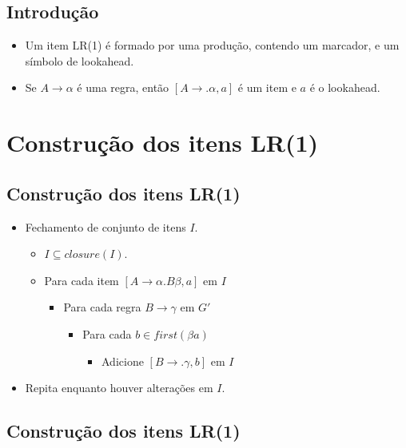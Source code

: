 \documentclass[11pt]{article}
\begin{document}
\subsection*{Introdução}
\label{sec:org03444a3}

\begin{itemize}
\item Um item LR(1) é formado por uma produção, contendo um marcador, e um símbolo de lookahead.

\item Se \(A \to \alpha\) é uma regra, então \([A \to .\alpha, a]\) é um item e \(a\) é o lookahead.
\end{itemize}
\section*{Construção dos itens LR(1)}
\label{sec:org937a90d}

\subsection*{Construção dos itens LR(1)}
\label{sec:org17896cc}

\begin{itemize}
\item Fechamento de conjunto de itens \(I\).
\begin{itemize}
\item \(I\subseteq closure(I)\).
\item Para cada item \([A\to \alpha \textbf{.}B\beta,a]\) em \(I\)
\begin{itemize}
\item Para cada regra \(B \to \gamma\) em \(G'\)
\begin{itemize}
\item Para cada \(b\in first(\beta a)\)
\begin{itemize}
\item Adicione \([B \to .\gamma,b]\) em \(I\)
\end{itemize}
\end{itemize}
\end{itemize}
\end{itemize}
\item Repita enquanto houver alterações em \(I\).
\end{itemize}
\subsection*{Construção dos itens LR(1)}
\label{sec:org519263b}
\end{document}
